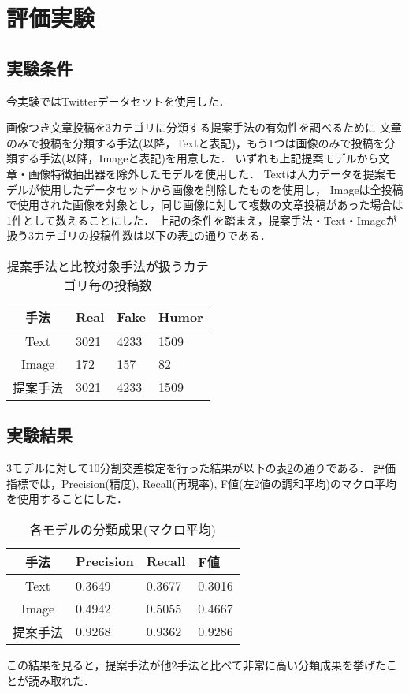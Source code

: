 %
\section{評価実験}\label{ch:experiment}
%
\subsection{実験条件}
今実験ではTwitterデータセットを使用した\cite{boididou2015verifying}．
% 

画像つき文章投稿を3カテゴリに分類する提案手法の有効性を調べるために
文章のみで投稿を分類する手法(以降，Textと表記)，もう1つは画像のみで投稿を分類する手法(以降，Imageと表記)を用意した．
いずれも上記提案モデルから文章・画像特徴抽出器を除外したモデルを使用した．
Textは入力データを提案モデルが使用したデータセットから画像を削除したものを使用し，
Imageは全投稿で使用された画像を対象とし，同じ画像に対して複数の文章投稿があった場合は1件として数えることにした．
上記の条件を踏まえ，提案手法・Text・Imageが扱う3カテゴリの投稿件数は以下の表\ref{table:posts}の通りである．

\begin{table}[h]
    \caption{提案手法と比較対象手法が扱うカテゴリ毎の投稿数}
    \label{table:posts}
    \centering
    \begin{tabular}{clll}
        \hline
        手法 & Real & Fake & Humor \\
        \hline \hline
        Text & 3021 & 4233 & 1509 \\
        Image & 172 & 157 & 82 \\
        提案手法 & 3021 & 4233 & 1509 \\
        \hline
    \end{tabular}
\end{table}

\subsection{実験結果}
3モデルに対して10分割交差検定を行った結果が以下の表\ref{table:result}の通りである．
評価指標では，Precision(精度), Recall(再現率), F値(左2値の調和平均)のマクロ平均を使用することにした．
% 
\begin{table}[h]
    \caption{各モデルの分類成果(マクロ平均)}
    \label{table:result}
    \centering
    \begin{tabular}{clll}
        \hline
        手法 & Precision & Recall & F値 \\
        \hline \hline
        Text & 0.3649 & 0.3677 & 0.3016 \\
        Image & 0.4942 & 0.5055 & 0.4667 \\
        提案手法 & 0.9268 & 0.9362 & 0.9286 \\
        \hline
    \end{tabular}
\end{table}

この結果を見ると，提案手法が他2手法と比べて非常に高い分類成果を挙げたことが読み取れた．
